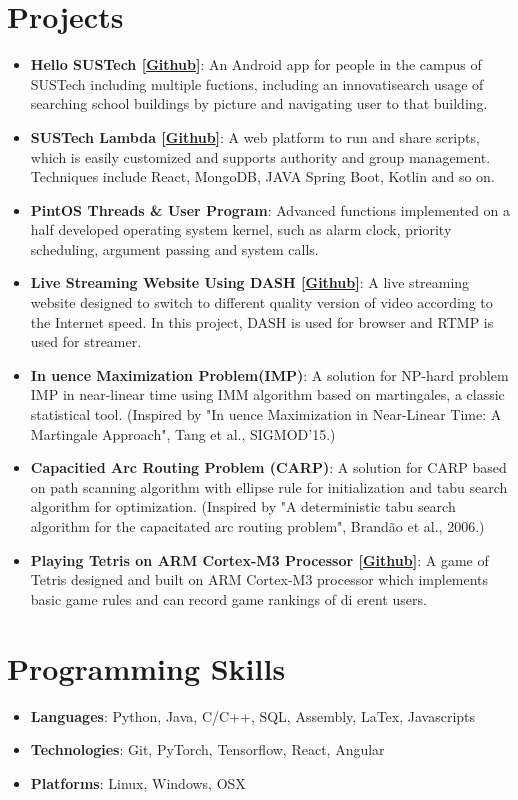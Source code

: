 \documentclass[letterpaper,11pt]{article}
\newcommand{\resumeItem}[2]{
  \item\small{
    \textbf{#1}{: #2 \vspace{-2pt}}
  }
}
\newcommand{\resumeSubItem}[2]{\resumeItem{#1}{#2}\vspace{-4pt}}
\newcommand{\resumeSubHeadingListStart}{\begin{itemize}[leftmargin=*]}
\newcommand{\resumeSubHeadingListEnd}{\end{itemize}}
\begin{document}
\section{Projects}
  \resumeSubHeadingListStart
    \resumeSubItem{Hello SUSTech [\href{https://github.com/RainyTong/Hello-SUSTech}{Github}]}
      {An Android app for people in the campus of SUSTech including multiple fuctions, including an innovatisearch usage of searching school buildings by picture and navigating user to that building.}
    \resumeSubItem{SUSTech Lambda [\href{https://github.com/Henrycobaltech/SUSTechLambda}{Github}]}
      {A web platform to run and share scripts, which is easily customized and supports authority and group management. Techniques include React, MongoDB, JAVA Spring Boot, Kotlin and so on.}
    \resumeSubItem{PintOS Threads \& User Program}
      {Advanced functions implemented on a half developed operating system kernel, such as alarm clock, priority scheduling, argument passing and system calls.}
     \resumeSubItem{Live Streaming Website Using DASH [\href{https://github.com/RainyTong/Live-Streaming-Website-using-DASH}{Github}]}
      {A live streaming website designed to switch to different quality version of video according to the Internet speed. In this project, DASH is used for browser and RTMP is used for streamer.}
      \resumeSubItem{In uence Maximization Problem(IMP)}
        {A solution for NP-hard problem IMP in near-linear time using IMM algorithm based on martingales, a classic statistical tool. (Inspired by "In uence Maximization in Near-Linear Time: A Martingale Approach", Tang et al., SIGMOD’15.)}
      \resumeSubItem{Capacitied Arc Routing Problem (CARP)}
        {A solution for CARP based on path scanning algorithm with ellipse rule for initialization and tabu search algorithm for optimization. (Inspired by "A deterministic tabu search algorithm for the capacitated arc routing problem", Brandão et al., 2006.)}
        
      \resumeSubItem{Playing Tetris on ARM Cortex-M3 Processor [\href{https://github.com/DennielZhang/SUSTech-CS301-Embeded-System-Project}{Github}]}
      {A game of Tetris designed and built on ARM Cortex-M3 processor which implements basic game rules and can record game rankings of di erent users.}
      
        
  \resumeSubHeadingListEnd
%
\section{Programming Skills}
 \resumeSubHeadingListStart
   \item{
      \textbf{Languages}{: Python, Java, C/C++, SQL, Assembly, LaTex, Javascripts}
   }
   \item{
      \textbf{Technologies}{: Git, PyTorch, Tensorflow, React, Angular}
   }
   \item{
      \textbf{Platforms}{: Linux, Windows, OSX}
   }
 \resumeSubHeadingListEnd
 
\end{document}
